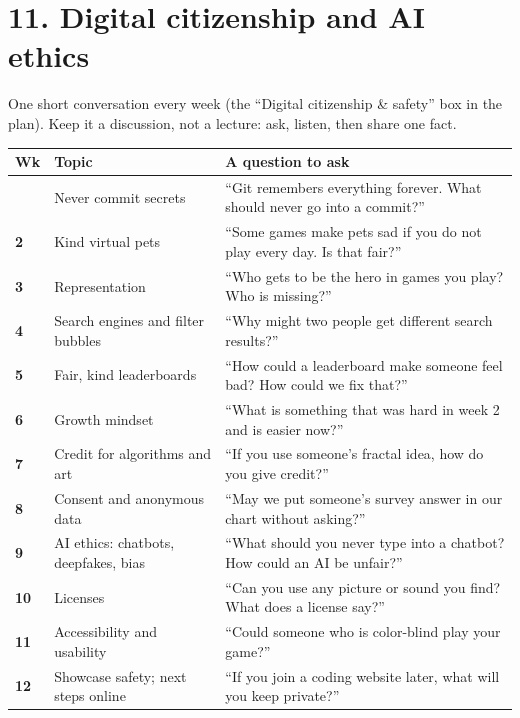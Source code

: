 \documentclass[level=3,teacher]{kidscode}
\begin{document}
\section{11. Digital citizenship and AI ethics}

One short conversation every week (the \enquote{Digital citizenship \& safety} box in the plan).
Keep it a discussion, not a lecture: ask, listen, then share one fact.

\begin{longtable}{@{}>{\bfseries}p{0.8cm}>{\raggedright\arraybackslash}p{4.6cm}p{\dimexpr\linewidth-5.4cm-4\tabcolsep}@{}}
\toprule
\rowcolor{kcaccent!15} Wk & Topic & A question to ask\\ \midrule\endhead
\bottomrule\endfoot
1 & Never commit secrets & \enquote{Git remembers everything forever. What should never go into a commit?}\\ \midrule
2 & Kind virtual pets & \enquote{Some games make pets sad if you do not play every day. Is that fair?}\\ \midrule
3 & Representation & \enquote{Who gets to be the hero in games you play? Who is missing?}\\ \midrule
4 & Search engines and filter bubbles & \enquote{Why might two people get different search results?}\\ \midrule
5 & Fair, kind leaderboards & \enquote{How could a leaderboard make someone feel bad? How could we fix that?}\\ \midrule
6 & Growth mindset & \enquote{What is something that was hard in week 2 and is easier now?}\\ \midrule
7 & Credit for algorithms and art & \enquote{If you use someone's fractal idea, how do you give credit?}\\ \midrule
8 & Consent and anonymous data & \enquote{May we put someone's survey answer in our chart without asking?}\\ \midrule
9 & AI ethics: chatbots, deepfakes, bias & \enquote{What should you never type into a chatbot? How could an AI be unfair?}\\ \midrule
10 & Licenses & \enquote{Can you use any picture or sound you find? What does a license say?}\\ \midrule
11 & Accessibility and usability & \enquote{Could someone who is color-blind play your game?}\\ \midrule
12 & Showcase safety; next steps online & \enquote{If you join a coding website later, what will you keep private?}\\
\end{longtable}
\end{document}
